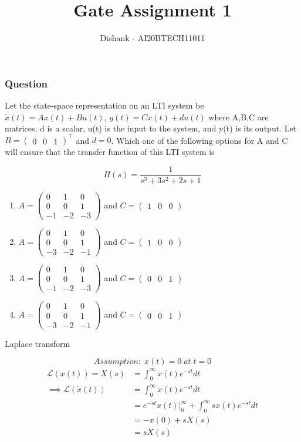 \documentclass[9pt]{beamer}
\title{Gate Assignment 1}
\author{Dishank - AI20BTECH11011}
\date{}
\begin{document}
\newcommand{\myvec}[1]{\ensuremath{\begin{pmatrix}#1\end{pmatrix}}}


\begin{frame}
\titlepage
\end{frame}

\begin{frame}
\frametitle{Question}
Let the state-space representation on an LTI system be $\dot{x}(t) = Ax(t)+Bu(t)$, $y(t)=Cx(t)+du(t)$ where A,B,C are matrices,  d is a scalar, u(t) is the input to the system, and y(t) is its output. Let $B = \myvec{ 0 & 0 &  1}^\top$ and $d = 0$. Which one of the following options for A and C will ensure that the transfer function of this LTI system is 

\begin{equation}
    H(s) = \dfrac{1}{s^3+3s^2+2s+1}
\end{equation}

\begin{enumerate}[A]
    \item $A = \myvec{
     0 &  1 &  0\\ 
     0 &  0 &  1\\
    -1 & -2 & -3
    }$ and $C = \myvec{1 & 0 & 0}$
    \item $A = \myvec{
     0 &  1 &  0\\ 
     0 &  0 &  1\\
    -3 & -2 & -1
    }$ and $C = \myvec{1 & 0 & 0}$
    \item $A = \myvec{
     0 &  1 &  0\\ 
     0 &  0 &  1\\
    -1 & -2 & -3
    }$ and $C = \myvec{0 & 0 & 1}$
    \item $A = \myvec{
     0 &  1 &  0\\ 
     0 &  0 &  1\\
    -3 & -2 & -1
    }$ and $C = \myvec{0 & 0 & 1}$
\end{enumerate}
\end{frame}

\begin{frame}{Laplace transform}
    
    \begin{equation}
        Assumption: \; x(t) = 0\; at\; t=0
    \end{equation}
    \begin{align}
        \mathcal{L}(x(t)) = X(s) &= \int_{0}^{\infty}x(t)e^{-st}dt\\
        \implies \mathcal{L}(\dot{x}(t)) &= \int_{0}^{\infty}\dot{x}(t)e^{-st}dt\\
                                         &= e^{-st}x(t)\big \lvert_{0}^{\infty} + \int_{0}^{\infty}sx(t)e^{-st}dt\\
                                         &= -x(0)+sX(s)\\
                                         &= sX(s)
    \end{align}
\end{frame}
\end{document}
